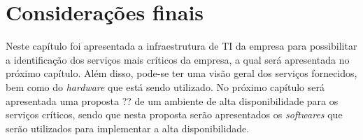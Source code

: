 \section{Considerações finais}

Neste capítulo foi apresentada a infraestrutura de \ac{TI} da empresa para possibilitar a identificação dos serviços mais críticos 
da empresa, a qual será apresentada no próximo capítulo. Além disso, pode-se ter uma visão geral dos serviços fornecidos, bem como do 
\textit{hardware} que está sendo utilizado. No próximo capítulo será apresentada uma proposta ?? de um ambiente de alta disponibilidade 
para os serviços críticos, sendo que nesta proposta serão apresentados os \textit{softwares} que serão utilizados para implementar a alta 
disponibilidade.
